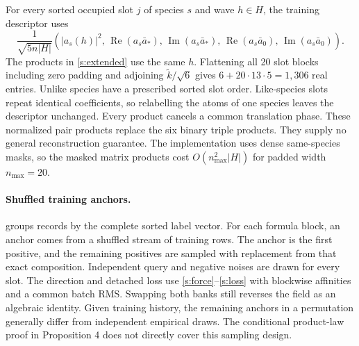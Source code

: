 For every sorted occupied slot $j$ of species $s$ and wave $h\in H$, the training descriptor uses
\begin{equation}
 \frac{1}{\sqrt{5n|H|}}
 \left(|a_s(h)|^2,\,
 \operatorname{Re}(a_s\bar a_*),\,\operatorname{Im}(a_s\bar a_*),\,
 \operatorname{Re}(a_s\bar a_0),\,\operatorname{Im}(a_s\bar a_0)\right).
 \label{s:extended}
\end{equation}
The products in \eqref{s:extended} use the same $h$. Flattening all 20 slot blocks including zero padding and adjoining $\tilde k/\sqrt6$ gives $6+20\cdot13\cdot5=1{,}306$ real entries. Unlike species have a prescribed sorted slot order. Like-species slots repeat identical coefficients, so relabelling the atoms of one species leaves the descriptor unchanged. Every product cancels a common translation phase. These normalized pair products replace the six binary triple products. They supply no general reconstruction guarantee. The implementation uses dense same-species masks, so the masked matrix products cost $O(n_{\max}^2|H|)$ for padded width $n_{\max}=20$.

\paragraph{Shuffled training anchors.}
 groups records by the complete sorted label vector. For each formula block, an anchor comes from a shuffled stream of training rows. The anchor is the first positive, and the remaining positives are sampled with replacement from that exact composition. Independent query and negative noises are drawn for every slot. The direction and detached loss use \eqref{s:force}--\eqref{s:loss} with blockwise affinities and a common batch RMS. Swapping both banks still reverses the field as an algebraic identity. Given training history, the remaining anchors in a permutation generally differ from independent empirical draws. The conditional product-law proof in Proposition 4 does not directly cover this sampling design.

